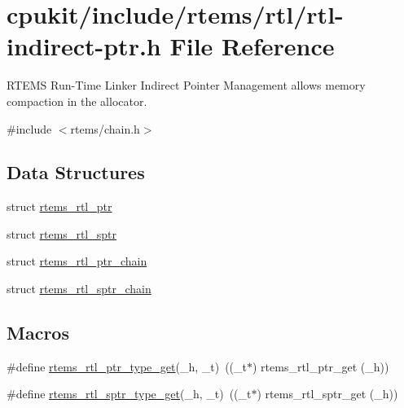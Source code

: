 \hypertarget{rtl-indirect-ptr_8h}{}\section{cpukit/include/rtems/rtl/rtl-\/indirect-\/ptr.h File Reference}
\label{rtl-indirect-ptr_8h}


R\+T\+E\+MS Run-\/\+Time Linker Indirect Pointer Management allows memory compaction in the allocator.  


{\ttfamily \#include $<$rtems/chain.\+h$>$}\newline
\subsection*{Data Structures}
\begin{DoxyCompactItemize}
\item 
struct \mbox{\hyperlink{structrtems__rtl__ptr}{rtems\+\_\+rtl\+\_\+ptr}}
\item 
struct \mbox{\hyperlink{structrtems__rtl__sptr}{rtems\+\_\+rtl\+\_\+sptr}}
\item 
struct \mbox{\hyperlink{structrtems__rtl__ptr__chain}{rtems\+\_\+rtl\+\_\+ptr\+\_\+chain}}
\item 
struct \mbox{\hyperlink{structrtems__rtl__sptr__chain}{rtems\+\_\+rtl\+\_\+sptr\+\_\+chain}}
\end{DoxyCompactItemize}
\subsection*{Macros}
\begin{DoxyCompactItemize}
\item 
\#define \mbox{\hyperlink{rtl-indirect-ptr_8h_ad9a4901ea8002117e32d27dbfae17a97}{rtems\+\_\+rtl\+\_\+ptr\+\_\+type\+\_\+get}}(\+\_\+h,  \+\_\+t)~((\+\_\+t$\ast$) rtems\+\_\+rtl\+\_\+ptr\+\_\+get (\+\_\+h))
\item 
\#define \mbox{\hyperlink{rtl-indirect-ptr_8h_ac64dd5dc1da80a4189154bbc4deda5fc}{rtems\+\_\+rtl\+\_\+sptr\+\_\+type\+\_\+get}}(\+\_\+h,  \+\_\+t)~((\+\_\+t$\ast$) rtems\+\_\+rtl\+\_\+sptr\+\_\+get (\+\_\+h))
\end{DoxyCompactItemize}

